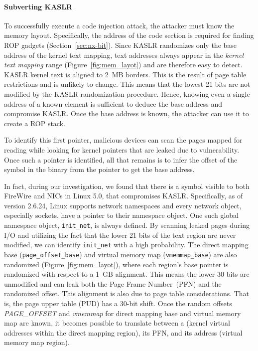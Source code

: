 
\paragraph{Subverting KASLR}
To successfully execute a code injection attack, the attacker must know the memory layout. Specifically, the address of the code section is required for finding ROP gadgets (Section~\ref{sec:nx-bit}). 
Since KASLR randomizes only the base address of the kernel text mapping, text addresses always appear in the \textit{kernel text mapping} range (Figure~\ref{fig:mem_layot}) and are therefore easy to detect. KASLR kernel text is aligned to 2~MB borders. This is the result of page table restrictions and is unlikely to change. This means that the lowest 21 bits are not modified by the KASLR randomization procedure. Hence, knowing even a single address of a known element is sufficient to deduce the base address and compromise KASLR. Once the base address is known, the attacker can use it to create a ROP stack.

To identify this first pointer, malicious devices can scan the pages mapped for reading while looking for kernel pointers that are leaked due to \subpage{} vulnerability. Once such a pointer is identified, all that remains is to infer the offset of the symbol in the binary from the pointer to get the base address.%

In fact, during our investigation, we found that there is a symbol visible to both FireWire and NICs in Linux 5.0, that compromises  KASLR. Specifically, as of version 2.6.24, Linux supports network namespaces and every network object, especially sockets, have a pointer to their namespace object. One such global namespace object, \texttt{init\_net}, is always defined. By scanning leaked pages during I/O and utilizing the fact that the lower 21 bits of the text region are never modified, we can identify \texttt{init\_net} with a high probability.
The direct mapping base (\texttt{page\_offset\_base}) and virtual memory map (\texttt{vmemmap\_base}) are also randomized (Figure~\ref{fig:mem_layot}), where each region's base pointer is randomized with respect to a 1~GB alignment. This means the lower 30 bits are unmodified and can leak both the Page Frame Number~(PFN) and the randomized offset. This alignment is also due to page table considerations. That is, the page upper table (PUD) has a 30-bit shift. Once the random offsets \textit{PAGE\_OFFSET} and \textit{vmemmap} for direct mapping base and virtual memory map are known, it becomes possible to translate between a \kva{} (kernel virtual addresses within the direct mapping region), its PFN, and its \page{} address (virtual memory map region).

